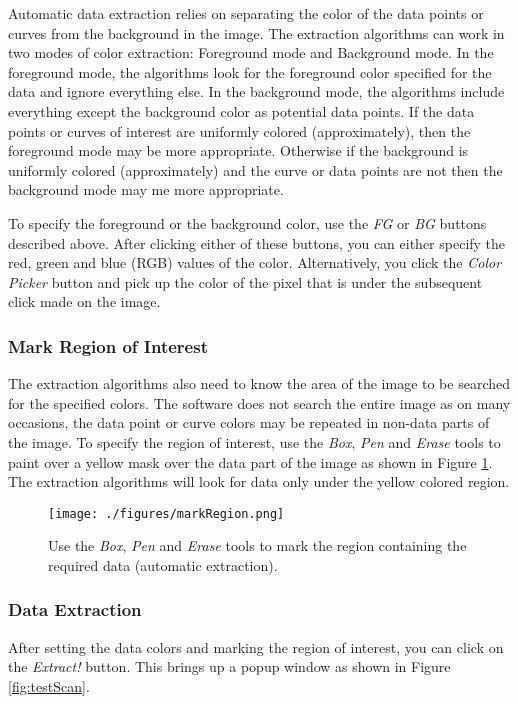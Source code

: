 \documentclass[letterpaper, 10pt]{article}
\begin{document}
Automatic data extraction relies on separating the color of the data points or curves from the background in the image. The extraction algorithms can work in two modes of color extraction: Foreground mode and Background mode. In the foreground mode, the algorithms look for the foreground color specified for the data and ignore everything else. In the background mode, the algorithms include everything except the background color as potential data points. If the data points or curves of interest are uniformly colored (approximately), then the foreground mode may be more appropriate. Otherwise if the background is uniformly colored (approximately) and the curve or data points are not then the background mode may me more appropriate.

To specify the foreground or the background color, use the \emph{FG} or \emph{BG} buttons described above. After clicking either of these buttons, you can either specify the red, green and blue (RGB) values of the color. Alternatively, you click the \emph{Color Picker} button and pick up the color of the pixel that is under the subsequent click made on the image.
\subsubsection{Mark Region of Interest}
The extraction algorithms also need to know the area of the image to be searched for the specified colors. The software does not search the entire image as on many occasions, the data point or curve colors may be repeated in non-data parts of the image. To specify the region of interest, use the \emph{Box}, \emph{Pen} and \emph{Erase} tools to paint over a yellow mask over the data part of the image as shown in Figure \ref{fig:markRegion}. The extraction algorithms will look for data only under  the yellow colored region. 
\begin{figure}
\begin{center}
\texttt{[image: ./figures/markRegion.png]}
\caption{Use the \emph{Box}, \emph{Pen} and \emph{Erase} tools to mark the region containing the required data (automatic extraction).}
\label{fig:markRegion}
\end{center}
\end{figure}

\subsubsection{Data Extraction}
After setting the data colors and marking the region of interest, you can click on the \emph{Extract!} button. This brings up a popup window as shown in Figure \ref{fig:testScan}. 
\end{document}

